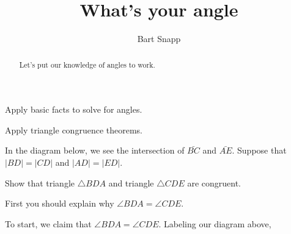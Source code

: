 \documentclass[nooutcomes,noauthor,hints]{ximera}
\title{What's your angle}
\author{Bart Snapp}
\begin{document}
\begin{abstract}
  Let's put our knowledge of angles to work. 
\end{abstract}
\maketitle


\begin{listOutcomes}
\item Apply basic facts to solve for angles.
\item Apply triangle congruence theorems.
\item 
\end{listOutcomes}

\mynewpage



\begin{question}
  In the diagram below, we see the intersection of $\bar{BC}$ and
  $\bar{AE}$. Suppose that $\left\vert BD\right\vert =\left\vert
  CD\right\vert $ and $\left\vert AD\right\vert =\left\vert
  ED\right\vert $.
  \begin{center}
  \end{center}
  Show that triangle $\triangle BDA$ and triangle $\triangle CDE$ are
  congruent.
  
  \begin{hint}
    First you should explain why $\angle BDA = \angle CDE$.
  \end{hint}
  \begin{freeResponse}
    To start, we claim that $\angle BDA = \angle CDE$. Labeling our
    diagram above,
    \begin{center}
\end{center}
\end{freeResponse}
\end{question}
\end{document}
